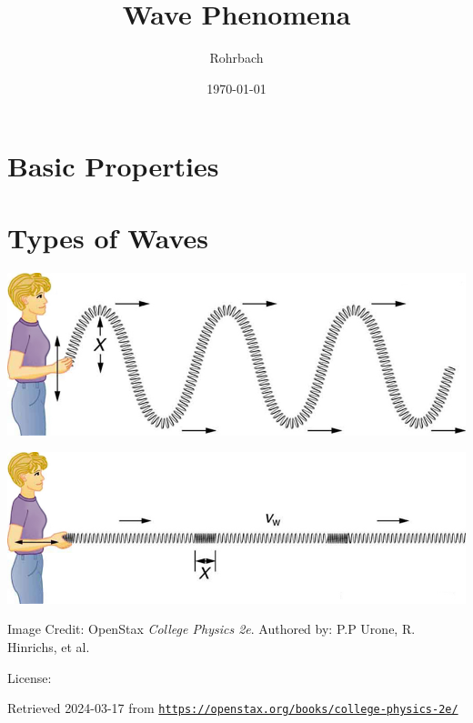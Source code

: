 \documentclass[10pt]{exam}
\title{Wave Phenomena}
\author{Rohrbach}
\date{\today}
\begin{document}
\maketitle

\section*{Basic Properties}

\vs

\section*{Types of Waves}

\vspace{1em}

\begin{center}
  \includegraphics{transverse.jpg}
  
  \vspace{3em}
  
  \includegraphics{longitudinal.jpg}

 
\end{center}

{\footnotesize Image Credit: OpenStax \emph{College Physics 2e}. Authored by: P.P Urone, R. Hinrichs, et al. }

{\footnotesize License:} \cc\hspace{-1em}

{\footnotesize Retrieved 2024-03-17 from \texttt{\href{https://openstax.org/books/college-physics-2e/pages/16-9-waves}{https://openstax.org/books/college-physics-2e/}} }
\pagebreak
\end{document}

